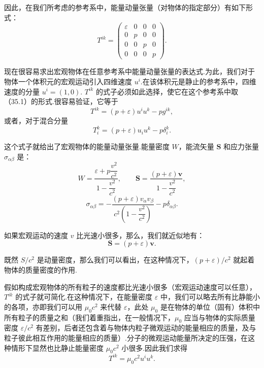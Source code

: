 因此，在我们所考虑的参考系中，能量动量张量（对物体的指定部分）有如下形式：
\begin{equation}
  T^{ik}=
  \begin{pmatrix}
    \varepsilon & 0 & 0 & 0\\
    0 & p & 0 & 0\\
    0 & 0 & p & 0\\
    0 & 0 & 0 & p
  \end{pmatrix}.
\end{equation}

现在很容易求出宏观物体在任意参考系中能量动量张量的表达式.为此，我们对于物体一个体积元的宏观运动引入四维速度
$u^i$.在该体积元是静止的参考系中，四维速度的分量 $u^i=(1,0)$. $T^{ik}$
的式子必须如此选择，使它在这个参考系中取（35.1）的形式.很容易验证，它等于
\begin{equation}
  T^{ik}=(p+\varepsilon)u^iu^k-pg^{ik},
\end{equation}
或者，对于混合分量
\begin{equation*}
  T_i^k=(p+\varepsilon)u_iu^k-p\delta_i^k.
\end{equation*}

这个式子就给出了宏观物体的能量动量张量.能量密度 $W$，能流矢量 $\boldsymbol{S}$
和应力张量 $\sigma_{\alpha\beta}$ 是：
\begin{equation}
  W=\frac{\varepsilon+p\dfrac{v^2}{c^2}}{1-\dfrac{v^2}{c^2}},\qquad
  \boldsymbol{S}=\frac{(p+\varepsilon)\boldsymbol{v}}{1-\dfrac{v^2}{c^2}},
\end{equation}
\begin{equation*}
  \sigma_{\alpha\beta}
  =-\frac{(p+\varepsilon)v_\alpha v_\beta}
  {c^2\left(1-\dfrac{v^2}{c^2}\right)}-p\delta_{\alpha\beta}.
\end{equation*}

如果宏观运动的速度 $v$ 比光速小很多，那么，我们就近似地有：
\begin{equation*}
  \boldsymbol{S}=(p+\varepsilon)\boldsymbol{v}.
\end{equation*}

既然 $S/c^2$
是动量密度，那么我们可以看出，在这种情况下，$(p+\varepsilon)/c^2$
就起着物体的质量密度的作用.

假如构成宏观物体的所有粒子的速度都比光速小很多（宏观运动速度可以任意），$T^{ik}$
的式子就可简化.在这种情况下，在能量密度 $\varepsilon$
中，我们可以略去所有比静能小的各项，亦即我们可以用 $\mu_0c^2$ 来代替 $\varepsilon$，此处
$\mu_0$
是在物体的单位（固有）体积中所有粒子的质量之和（我们着重指出，在一般情况下，$\mu_0$
应当与物体的实际质量密度 $\varepsilon/c^2$
有差别，后者还包含着与物体内粒子微观运动的能量相应的质量，及与粒子彼此相互作用的能量相应的质量）.分子的微观运动能量所决定的压强，在这种情形下显然也比静止能量密度
$\mu_0c^2$ 小很多.因此我们求得
\begin{equation}
  T^{ik}=\mu_0c^2u^iu^k.
\end{equation}

